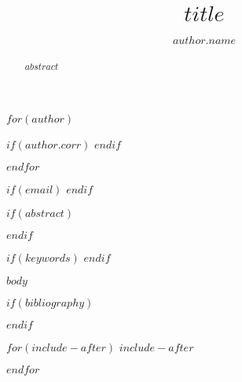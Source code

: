 \documentclass[$if(documentclass)$$documentclass$$else$article$endif$$if(classoption)$,$classoption$$endif$]{JASA-El}
\begin{document}
\title[$runningtitle$]{$title$}

$for(author)$
 \author{$author.name$}

 $if(author.corr)$
  \correspondingauthor
 $endif$

$endfor$

$if(email)$
$endif$

$if(abstract)$
 \begin{abstract}
$abstract$
 \end{abstract}
$endif$

$if(keywords)$
$endif$



\maketitle

$body$

$if(bibliography)$


$endif$

$for(include-after)$
$include-after$

$endfor$
\end{document}
